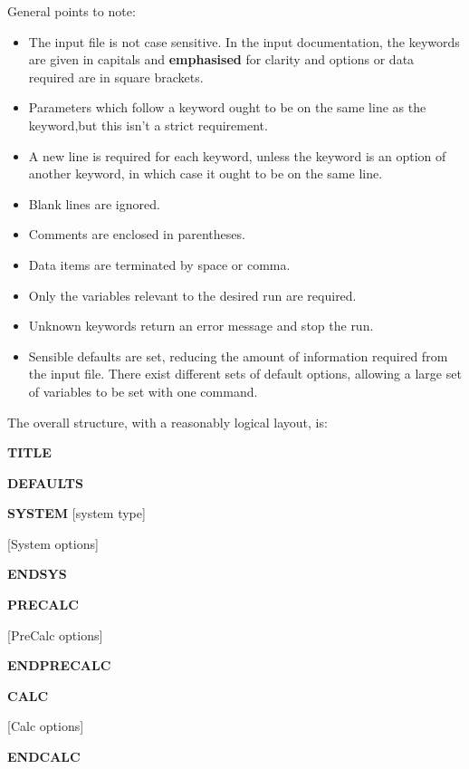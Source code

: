 \documentclass[openany,a4paper,10pt]{manual}
\begin{document}
General points to note:
\begin{itemize}
\item {} 
The input file is not case sensitive.  In the input documentation, the keywords are given in capitals and \textbf{emphasised} for clarity and options or data required are in square brackets.

\item {} 
Parameters which follow a keyword ought to be on the same line as the keyword,but this isn't a strict requirement.

\item {} 
A new line is required for each keyword, unless the keyword is an option of another keyword, in which case it ought to be on the same line.

\item {} 
Blank lines are ignored.

\item {} 
Comments are enclosed in parentheses.

\item {} 
Data items are terminated by space or comma.

\item {} 
Only the variables relevant to the desired run are required.

\item {} 
Unknown keywords return an error message and stop the run.

\item {} 
Sensible defaults are set, reducing the amount of information required from the input file.  There exist different sets of default options, allowing a large set of variables to be set with one command.

\end{itemize}

The overall structure, with a reasonably logical layout, is:

\textbf{TITLE}

\textbf{DEFAULTS}

\textbf{SYSTEM} {[}system type{]}

{[}System options{]}

\textbf{ENDSYS}

\textbf{PRECALC}

{[}PreCalc options{]}

\textbf{ENDPRECALC}

\textbf{CALC}

{[}Calc options{]}

\textbf{ENDCALC}
\end{document}
